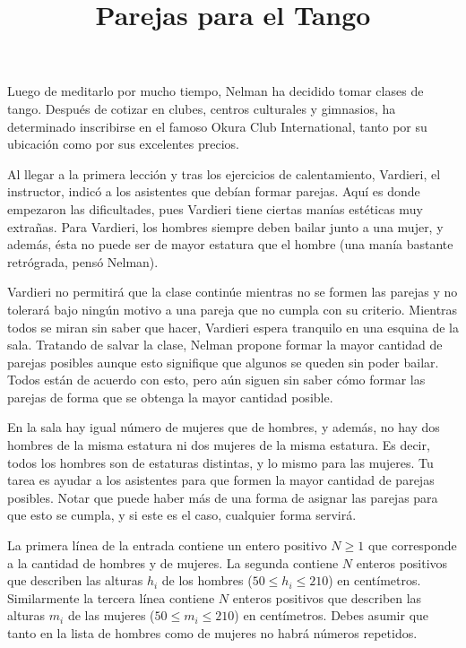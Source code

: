 \documentclass{oci}
\title{Parejas para el Tango}
\begin{document}
\begin{problemDescription}
Luego de meditarlo por mucho tiempo, Nelman ha decidido tomar clases de tango.
Después de cotizar en clubes, centros culturales y gimnasios, ha determinado
inscribirse en el famoso Okura Club International, tanto por su ubicación como
por sus excelentes precios.

Al llegar a la primera lección y tras los ejercicios de calentamiento,
Vardieri, el instructor, indicó a los asistentes que debían formar parejas.
Aquí es donde empezaron las dificultades, pues Vardieri tiene ciertas manías
estéticas muy extrañas. Para Vardieri, los hombres siempre deben bailar junto a
una mujer, y además, ésta no puede ser de mayor estatura que el hombre (una
manía bastante retrógrada, pensó Nelman).

Vardieri no permitirá que la clase continúe mientras no se formen las parejas y
no tolerará bajo ningún motivo a una pareja que no cumpla con su criterio.
Mientras todos se miran sin saber que hacer, Vardieri espera tranquilo en una
esquina de la sala. Tratando de salvar la clase, Nelman propone formar la mayor
cantidad de parejas posibles aunque esto signifique que algunos se queden sin
poder bailar. Todos están de acuerdo con esto, pero aún siguen sin saber cómo
formar las parejas de forma que se obtenga la mayor cantidad posible.

En la sala hay igual número de mujeres que de hombres, y además, no hay dos
hombres de la misma estatura ni dos mujeres de la misma estatura. Es decir,
todos los hombres son de estaturas distintas, y lo mismo para las mujeres. Tu
tarea es ayudar a los asistentes para que formen la mayor cantidad de parejas
posibles. Notar que puede haber más de una forma de asignar las parejas para
que esto se cumpla, y si este es el caso, cualquier forma servirá.

\end{problemDescription}

\begin{inputDescription}
La primera línea de la entrada contiene un entero positivo $N \geq 1$ que
corresponde a la cantidad de hombres y de mujeres. La segunda contiene $N$
enteros positivos que describen las alturas $h_i$ de los hombres ($50 \leq h_i
\leq 210$) en centímetros. Similarmente la tercera línea contiene $N$ enteros
positivos que describen las alturas $m_i$ de las mujeres ($50 \le m_i \le 210$)
en centímetros. Debes asumir que tanto en la lista de hombres como de mujeres
no habrá números repetidos.
\end{inputDescription}
\end{document}
